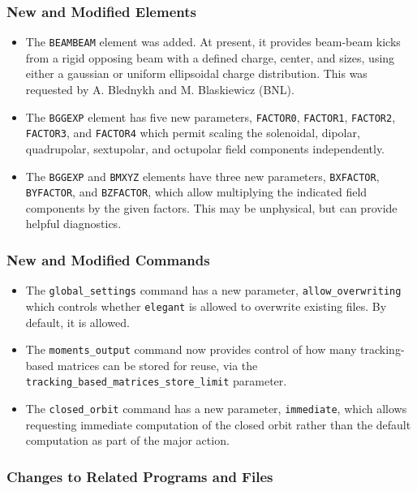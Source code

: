 \documentclass[11pt]{article}
\begin{document}
\subsubsection{New and Modified Elements}
\begin{itemize}
\item The \verb|BEAMBEAM| element was added. At present, it provides beam-beam kicks from a rigid opposing
  beam with a defined charge, center, and sizes, using either a gaussian or uniform ellipsoidal 
  charge distribution. This was requested by A. Blednykh and M. Blaskiewicz (BNL).
\item The \verb|BGGEXP| element has five new parameters, \verb|FACTOR0|, \verb|FACTOR1|, \verb|FACTOR2|, 
  \verb|FACTOR3|, and \verb|FACTOR4| which permit scaling the solenoidal, dipolar, quadrupolar, sextupolar, and
  octupolar field components independently.
\item The \verb|BGGEXP| and \verb|BMXYZ| elements have three new parameters, \verb|BXFACTOR|, \verb|BYFACTOR|,
  and \verb|BZFACTOR|, which allow multiplying the indicated field components by the given factors.
  This may be unphysical, but can provide helpful diagnostics.
\end{itemize}

\subsubsection{New and Modified Commands}
\begin{itemize}
\item The \verb|global_settings| command has a new parameter, \verb|allow_overwriting| which controls whether 
  \verb|elegant| is allowed to overwrite existing files. By default, it is allowed.
\item The \verb|moments_output| command now provides control of how many tracking-based matrices can be
  stored for reuse, via the \verb|tracking_based_matrices_store_limit| parameter.
\item The \verb|closed_orbit| command has a new parameter, \verb|immediate|, which allows requesting immediate
  computation of the closed orbit rather than the default computation as part of the major action.
\end{itemize}

\subsubsection{Changes to Related Programs and Files}
\end{document}

